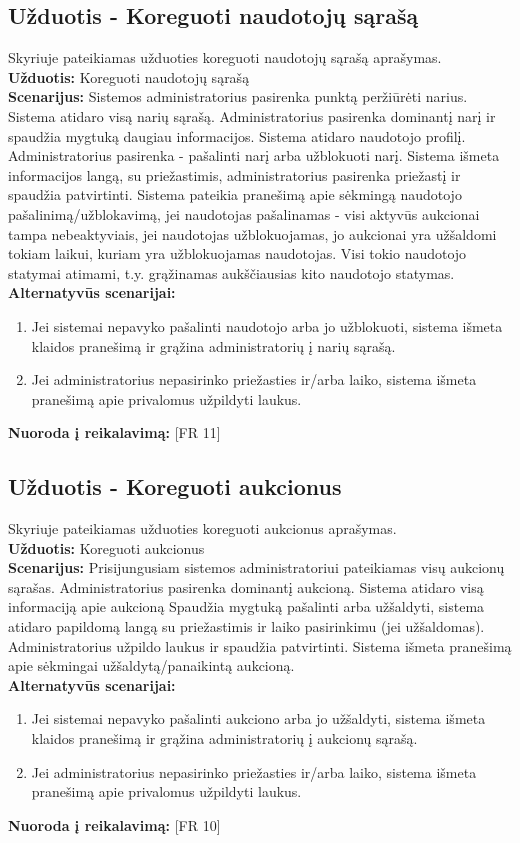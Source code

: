 \documentclass{VUMIFPSkursinis}
\begin{document}
	\subsection{Užduotis - Koreguoti naudotojų sąrašą}
	Skyriuje pateikiamas užduoties koreguoti naudotojų sąrašą aprašymas.\\
	\textbf{Užduotis:}  Koreguoti naudotojų sąrašą \\
	\textbf{Scenarijus:} Sistemos administratorius pasirenka punktą peržiūrėti narius. Sistema atidaro visą narių sąrašą. Administratorius pasirenka dominantį narį ir spaudžia mygtuką daugiau informacijos. Sistema atidaro naudotojo profilį. Administratorius pasirenka - pašalinti narį arba užblokuoti narį. Sistema išmeta informacijos langą, su priežastimis, administratorius pasirenka priežastį ir spaudžia patvirtinti. Sistema pateikia pranešimą apie sėkmingą naudotojo pašalinimą/užblokavimą, jei naudotojas pašalinamas - visi aktyvūs aukcionai tampa nebeaktyviais, jei naudotojas užblokuojamas, jo aukcionai yra užšaldomi tokiam laikui, kuriam yra užblokuojamas naudotojas. Visi tokio naudotojo statymai atimami, t.y. grąžinamas aukščiausias kito naudotojo statymas. \\
	\textbf{Alternatyvūs scenarijai:}
	\begin{enumerate}
		\item Jei sistemai nepavyko pašalinti naudotojo arba jo užblokuoti, sistema išmeta klaidos pranešimą ir grąžina administratorių į narių sąrašą. 
		\item Jei administratorius nepasirinko priežasties ir/arba laiko, sistema išmeta pranešimą apie privalomus užpildyti laukus. 
	\end{enumerate}
	\textbf{Nuoroda į reikalavimą: } [FR 11]
	
	\subsection{Užduotis - Koreguoti aukcionus}
	Skyriuje pateikiamas užduoties koreguoti aukcionus aprašymas.\\
	\textbf{Užduotis:}  Koreguoti aukcionus \\
	\textbf{Scenarijus:} Prisijungusiam sistemos administratoriui pateikiamas visų aukcionų sąrašas. Administratorius pasirenka dominantį aukcioną. Sistema atidaro visą informaciją apie aukcioną Spaudžia mygtuką pašalinti arba užšaldyti, sistema atidaro papildomą langą su priežastimis ir laiko pasirinkimu (jei užšaldomas). Administratorius užpildo laukus ir spaudžia patvirtinti. Sistema išmeta pranešimą apie sėkmingai užšaldytą/panaikintą aukcioną.\\
	\textbf{Alternatyvūs scenarijai:}
	\begin{enumerate}
		\item Jei sistemai nepavyko pašalinti aukciono arba jo užšaldyti, sistema išmeta klaidos pranešimą ir grąžina administratorių į aukcionų sąrašą. 
		\item Jei administratorius nepasirinko priežasties ir/arba laiko, sistema išmeta pranešimą apie privalomus užpildyti laukus. 
	\end{enumerate}
	\textbf{Nuoroda į reikalavimą: } [FR 10]
	
\end{document}
